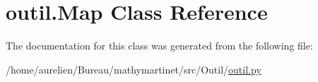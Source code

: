 \hypertarget{classoutil_1_1_map}{}\section{outil.\+Map Class Reference}
\label{classoutil_1_1_map}


The documentation for this class was generated from the following file\+:\begin{DoxyCompactItemize}
\item 
/home/aurelien/\+Bureau/mathymartinet/src/\+Outil/\hyperlink{outil_8py}{outil.\+py}\end{DoxyCompactItemize}
